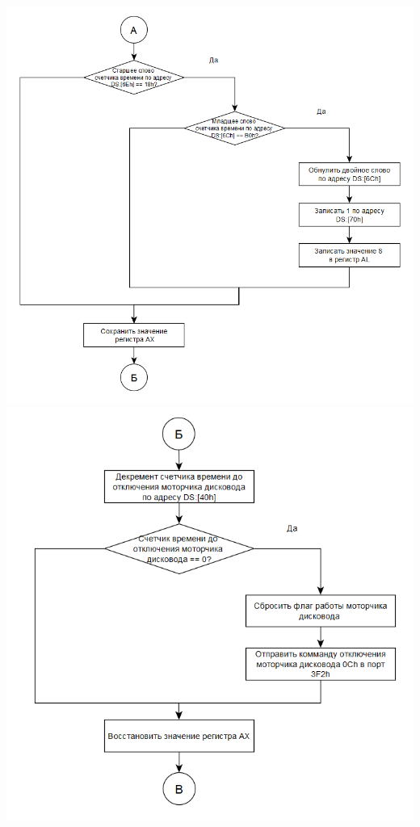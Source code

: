 \documentclass{article}
\begin{document}
\begin{center}
	\includegraphics{tools/Screenshot_4.png}
	\includegraphics{tools/Screenshot_3.png}

\end{center}
\end{document}
